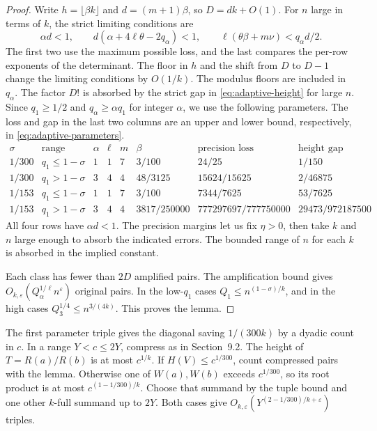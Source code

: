 \documentclass[11pt,reqno]{amsart}
\newcommand{\eps}{\varepsilon}
\begin{document}
\begin{proof}
Write \(h=\lfloor\beta k\rfloor\) and \(d=(m+1)\beta\), so
\(D=dk+O(1)\).
For \(n\) large in terms of \(k\), the strict limiting
conditions are
\begin{equation}\label{eq:adaptive-parameters}
 \alpha d<1,\qquad
 d(\alpha+4\ell\theta-2q_\alpha)<1,\qquad
 \ell(\theta\beta+m\nu)<q_\alpha d/2 .
\end{equation}
The first two use the maximum possible loss, and the last
compares the per-row exponents of the determinant.
The floor in \(h\) and the shift from \(D\) to \(D-1\)
change the limiting conditions by \(O(1/k)\).
The modulus floors are included in \(q_\alpha\).
The factor \(D!\) is absorbed by the strict gap in
\eqref{eq:adaptive-height} for large \(n\).
Since \(q_1\ge1/2\) and \(q_\alpha\ge\alpha q_1\) for integer
\(\alpha\), we use the following parameters. The loss and
gap in the last two columns are an upper and lower bound,
respectively, in \eqref{eq:adaptive-parameters}.
\[
\begin{array}{cc|rrrr|rr}
 \sigma & \text{range}&\alpha&\ell&m&\beta
       &\text{precision loss}&\text{height gap}\\ \hline
 1/300&q_1\le1-\sigma &1&1&7&3/100 &24/25&1/150\\
 1/300&q_1>1-\sigma  &3&4&4&48/3125 &15624/15625&2/46875\\
 1/153&q_1\le1-\sigma &1&1&7&3/100 &7344/7625&53/7625\\
 1/153&q_1>1-\sigma  &3&4&4&3817/250000 &777297697/777750000&29473/972187500
\end{array}
\]
All four rows have \(\alpha d<1\). The precision margins let us
fix \(\eta>0\), then take \(k\) and \(n\) large enough to
absorb the indicated errors. The bounded range of \(n\)
for each \(k\) is absorbed in the implied constant.

Each class has fewer than \(2D\) amplified pairs.
The amplification bound gives \(O_{k,\eps}(Q_\alpha^{1/\ell}n^\eps)\)
original pairs.
In the low-\(q_1\) cases \(Q_1\le n^{(1-\sigma)/k}\), and in the
high cases \(Q_3^{1/4}\le n^{3/(4k)}\).
This proves the lemma.
\end{proof}

The first parameter triple gives the diagonal saving
\(1/(300k)\) by a dyadic count in \(c\).
In a range \(Y<c\le2Y\), compress as in Section~9.2.
The height of \(T=R(a)/R(b)\) is at most \(c^{1/k}\).
If \(H(V)\le c^{1/300}\), count compressed pairs with the lemma.
Otherwise one of \(W(a),W(b)\) exceeds \(c^{1/300}\),
so its root product is at most \(c^{(1-1/300)/k}\).
Choose that summand by the tuple bound and one other
\(k\)-full summand up to \(2Y\). Both cases give
\(O_{k,\eps}(Y^{(2-1/300)/k+\eps})\) triples.
\end{document}
